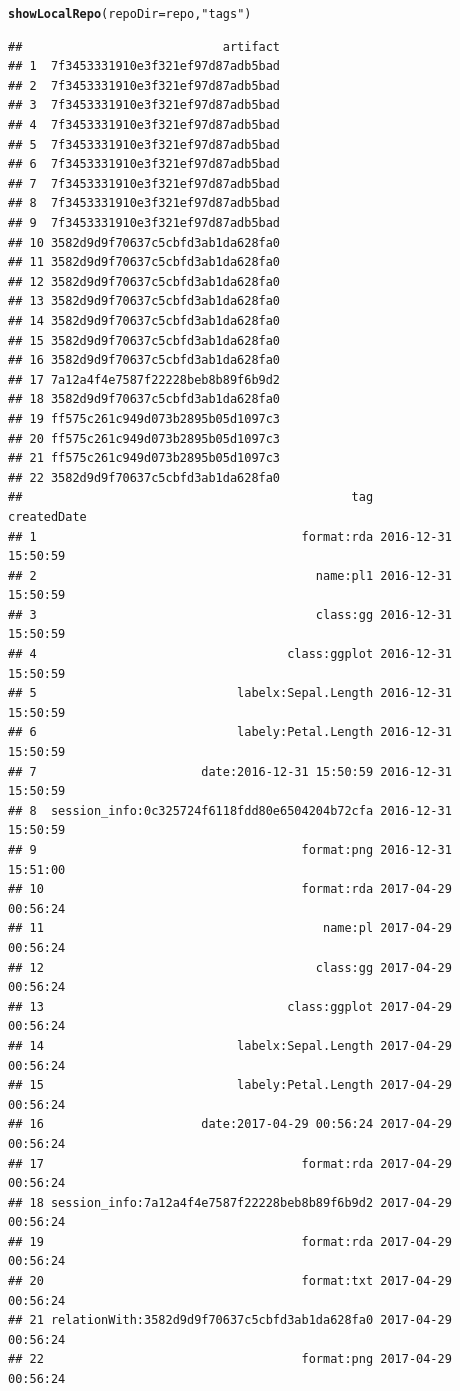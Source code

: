 \documentclass[nojss]{jss}\usepackage[]{graphicx}\usepackage[]{color}
\makeatletter
\newcommand{\hlstr}[1]{\textcolor[rgb]{0.192,0.494,0.8}{#1}}%
\newcommand{\hlstd}[1]{\textcolor[rgb]{0.345,0.345,0.345}{#1}}%
\newcommand{\hlkwc}[1]{\textcolor[rgb]{0.333,0.667,0.333}{#1}}%
\newcommand{\hlkwd}[1]{\textcolor[rgb]{0.737,0.353,0.396}{\textbf{#1}}}%
\newenvironment{kframe}{%
 \def\at@end@of@kframe{}%
 \ifinner\ifhmode%
  \def\at@end@of@kframe{\end{minipage}}%
  \begin{minipage}{\columnwidth}%
 \fi\fi%
 \def\FrameCommand##1{\hskip\@totalleftmargin \hskip-\fboxsep
 \colorbox{shadecolor}{##1}\hskip-\fboxsep
     \hskip-\linewidth \hskip-\@totalleftmargin \hskip\columnwidth}%
 \MakeFramed {\advance\hsize-\width
   \@totalleftmargin\z@ \linewidth\hsize
   \@setminipage}}%
 {\par\unskip\endMakeFramed%
 \at@end@of@kframe}
\newenvironment{knitrout}{}{} %
\makeatother
\begin{document}
\begin{knitrout}
\color{fgcolor}\begin{kframe}
\begin{alltt}
\hlkwd{showLocalRepo}\hlstd{(}\hlkwc{repoDir} \hlstd{= repo,} \hlstr{"tags"}\hlstd{)}
\end{alltt}
\begin{verbatim}
##                            artifact
## 1  7f3453331910e3f321ef97d87adb5bad
## 2  7f3453331910e3f321ef97d87adb5bad
## 3  7f3453331910e3f321ef97d87adb5bad
## 4  7f3453331910e3f321ef97d87adb5bad
## 5  7f3453331910e3f321ef97d87adb5bad
## 6  7f3453331910e3f321ef97d87adb5bad
## 7  7f3453331910e3f321ef97d87adb5bad
## 8  7f3453331910e3f321ef97d87adb5bad
## 9  7f3453331910e3f321ef97d87adb5bad
## 10 3582d9d9f70637c5cbfd3ab1da628fa0
## 11 3582d9d9f70637c5cbfd3ab1da628fa0
## 12 3582d9d9f70637c5cbfd3ab1da628fa0
## 13 3582d9d9f70637c5cbfd3ab1da628fa0
## 14 3582d9d9f70637c5cbfd3ab1da628fa0
## 15 3582d9d9f70637c5cbfd3ab1da628fa0
## 16 3582d9d9f70637c5cbfd3ab1da628fa0
## 17 7a12a4f4e7587f22228beb8b89f6b9d2
## 18 3582d9d9f70637c5cbfd3ab1da628fa0
## 19 ff575c261c949d073b2895b05d1097c3
## 20 ff575c261c949d073b2895b05d1097c3
## 21 ff575c261c949d073b2895b05d1097c3
## 22 3582d9d9f70637c5cbfd3ab1da628fa0
##                                              tag         createdDate
## 1                                     format:rda 2016-12-31 15:50:59
## 2                                       name:pl1 2016-12-31 15:50:59
## 3                                       class:gg 2016-12-31 15:50:59
## 4                                   class:ggplot 2016-12-31 15:50:59
## 5                            labelx:Sepal.Length 2016-12-31 15:50:59
## 6                            labely:Petal.Length 2016-12-31 15:50:59
## 7                       date:2016-12-31 15:50:59 2016-12-31 15:50:59
## 8  session_info:0c325724f6118fdd80e6504204b72cfa 2016-12-31 15:50:59
## 9                                     format:png 2016-12-31 15:51:00
## 10                                    format:rda 2017-04-29 00:56:24
## 11                                       name:pl 2017-04-29 00:56:24
## 12                                      class:gg 2017-04-29 00:56:24
## 13                                  class:ggplot 2017-04-29 00:56:24
## 14                           labelx:Sepal.Length 2017-04-29 00:56:24
## 15                           labely:Petal.Length 2017-04-29 00:56:24
## 16                      date:2017-04-29 00:56:24 2017-04-29 00:56:24
## 17                                    format:rda 2017-04-29 00:56:24
## 18 session_info:7a12a4f4e7587f22228beb8b89f6b9d2 2017-04-29 00:56:24
## 19                                    format:rda 2017-04-29 00:56:24
## 20                                    format:txt 2017-04-29 00:56:24
## 21 relationWith:3582d9d9f70637c5cbfd3ab1da628fa0 2017-04-29 00:56:24
## 22                                    format:png 2017-04-29 00:56:24
\end{verbatim}
\end{kframe}
\end{knitrout}
\end{document}
